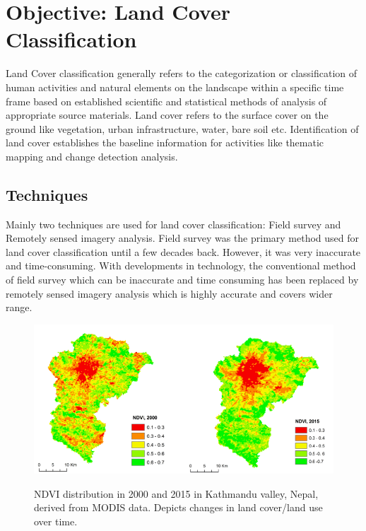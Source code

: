 \documentclass[12pt, a4paper]{report}
\begin{document}
\section{Objective: Land Cover Classification}
Land Cover classification generally refers to the categorization or classification of human activities and natural elements on the landscape within a specific time frame based on established scientific and statistical methods of analysis of appropriate source materials. Land cover refers to the surface cover on the ground like vegetation, urban infrastructure, water, bare soil etc. Identification of land cover establishes the baseline information for activities like thematic mapping and change detection analysis.\cite{landcoversig}
\subsection{Techniques}
Mainly two techniques are used for land cover classification: Field survey and Remotely sensed imagery analysis. Field survey was the primary method used for land cover classification until a few decades back. However, it was very inaccurate and time-consuming. With developments in technology, the conventional method of field survey which can be inaccurate and time consuming has been replaced by remotely sensed imagery analysis which is highly accurate and covers wider range.

\begin{figure}[h]
\centering
\includegraphics[width=\textwidth]{landcover.png}
\caption{NDVI distribution in 2000 and 2015 in Kathmandu valley, Nepal, derived from MODIS data. Depicts changes in land cover/land use over time.}
\cite{lcimg}
\end{figure}
\end{document}
